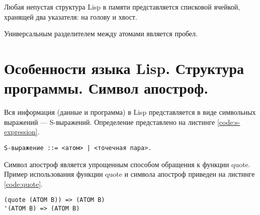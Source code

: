 Любая непустая структура Lisp в памяти представляется списковой ячейкой, хранящей два указателя: на голову и хвост.

Универсальным разделителем между атомами является пробел.

\section{Особенности языка Lisp. Структура программы. Символ апостроф.}
Вся информация (данные и программа) в Lisp представляется в виде символьных выражений --- S-выражений. Определение представлено на листинге \ref{code:s-expression}.

\begin{lstlisting}[label=code:s-expression, caption = Определение S-выражения.]
S-выражение ::= <атом> | <точечная пара>.
\end{lstlisting}

Символ апостроф является упрощенным способом обращения к функции quote. Пример использования функции quote и символа апостроф приведен на листинге \ref{code:quote}.
\newpage

\begin{lstlisting}[label=code:quote, caption = Пример использования функции quote и символа апостроф.]
(quote (ATOM B)) => (ATOM B)
'(ATOM B) => (ATOM B)
\end{lstlisting}

